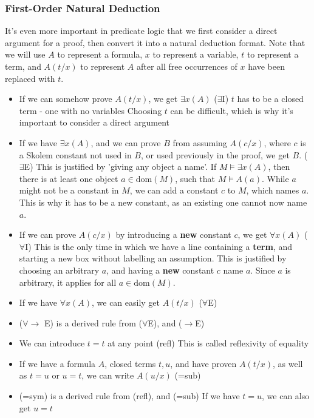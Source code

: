 \documentclass[a4paper, 12pt]{article}
\begin{document}
            \subsubsection*{First-Order Natural Deduction}
                It's even more important in predicate logic that we first consider a direct argument for a proof, then convert it into a natural deduction format. Note that we will use $A$ to represent a formula, $x$ to represent a variable, $t$ to represent a term, and $A(t/x)$ to represent $A$ after all free occurrences of $x$ have been replaced with $t$.
                \begin{itemize}
                    \itemsep0em
                    \item If we can somehow prove $A(t/x)$, we get $\exists x (A)$ \hfill ($\exists$I)
                        \subitem $t$ has to be a closed term - one with no variables
                        \subitem Choosing $t$ can be difficult, which is why it's important to consider a direct argument
                    \item If we have $\exists x (A)$, and we can prove $B$ from assuming $A(c/x)$, where $c$ is a Skolem constant not used in $B$, or used previously in the proof, we get $B$. \hfill ($\exists$E)
                        \subitem This is justified by 'giving any object a name'. If $M \vDash \exists x (A)$, then there is at least one object $a \in \text{dom}(M)$, such that $M \vDash A(a)$. While $a$ might not be a constant in $M$, we can add a constant $c$ to $M$, which names $a$. This is why it has to be a new constant, as an existing one cannot now name $a$.
                    \item If we can prove $A(c/x)$ by introducing a \textbf{new} constant $c$, we get $\forall x (A)$ \hfill ($\forall$I)
                        \subitem This is the only time in which we have a line containing a \textbf{term}, and starting a new box without labelling an assumption.
                        \subitem This is justified by choosing an arbitrary $a$, and having a \textbf{new} constant $c$ name $a$. Since $a$ is arbitrary, it applies for all $a \in \text{dom}(M)$.
                    \item If we have $\forall x (A)$, we can easily get $A(t/x)$ \hfill ($\forall$E)
                    \item ($\forall \rightarrow$ E) is a derived rule from ($\forall$E), and ($\rightarrow$E)
                    \item We can introduce $t = t$ at any point \hfill (refl)
                        \subitem This is called reflexivity of equality
                    \item If we have a formula $A$, closed terms $t,u$, and have proven $A(t/x)$, as well as $t = u$ or $u = t$, we can write $A(u/x)$ \hfill (=sub)
                    \item (=sym) is a derived rule from (refl), and (=sub)
                        \subitem If we have $t = u$, we can also get $u = t$
                \end{itemize}
\end{document}
